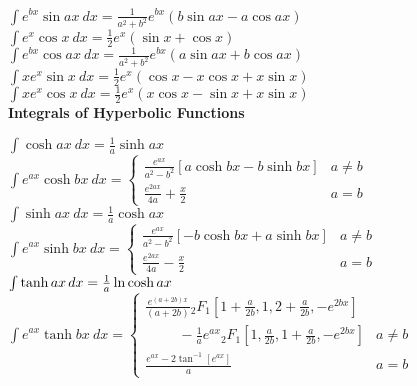 \documentclass[10pt,landscape,a4paper]{article}
\begin{document}
\begin{multicols*}{3}
$\label{eq:ritzert}
\int e^{bx} \sin ax\ dx = \frac{1}{a^2+b^2}e^{bx} (b\sin ax - a\cos ax) 
$\\

$
\int e^x \cos x\ dx = \frac{1}{2}e^x (\sin x + \cos x)  
$\\

$
\int e^{bx} \cos ax\ dx = \frac{1}{a^2 + b^2} e^{bx} ( a \sin ax + b \cos ax ) 
$\\

$
\int x e^x \sin x\ dx = \frac{1}{2}e^x (\cos x - x \cos x + x \sin x) 
$\\

$
\int x e^x \cos x\ dx = \frac{1}{2}e^x (x \cos x 
- \sin x + x \sin x) 
$\\

 \textbf{Integrals of Hyperbolic Functions}

$
\int \cosh ax\ dx =\frac{1}{a} \sinh ax 
$\\

$
\int e^{ax}  \cosh bx \ dx = 
\begin{cases}
\displaystyle{\frac{e^{ax}}{a^2-b^2} }[ a \cosh bx - b \sinh bx ]  & a\ne b \\
\displaystyle{\frac{e^{2ax}}{4a} + \frac{x}{2}}  & a = b
\end{cases}
$\\

$
\int \sinh ax\ dx = \frac{1}{a} \cosh ax 
$\\

$
\int e^{ax} \sinh bx \ dx =
\begin{cases}
\displaystyle{\frac{e^{ax}}{a^2-b^2} }[ -b \cosh bx + a \sinh bx ]  & a\ne b \\
\displaystyle{\frac{e^{2ax}}{4a} - \frac{x}{2}}  & a = b
\end{cases}
$\\


$\label{eq:yates}
\int  \tanh ax\hspace{1.5pt} dx =\frac{1}{a} \ln \cosh ax 
$\\

$\label{eq:dewitt}
\int  e^{ax} \tanh bx\ dx = 
\begin{cases}
\displaystyle{ \frac{ e^{(a+2b)x}}{(a+2b)} 
{_2F_1}\left[ 1+\frac{a}{2b},1,2+\frac{a}{2b}, -e^{2bx}\right] }& \\
\displaystyle{
\hspace{1cm}-\frac{1}{a}e^{ax}{_2F_1}\left[ 1, \frac{a}{2b},1+\frac{a}{2b}, -e^{2bx}\right]
}
 & a\ne b \\
\displaystyle{\frac{e^{ax}-2\tan^{-1}[e^{ax}]}{a} } & a = b
\end{cases}
$\\




\end{multicols*}
\end{document}
